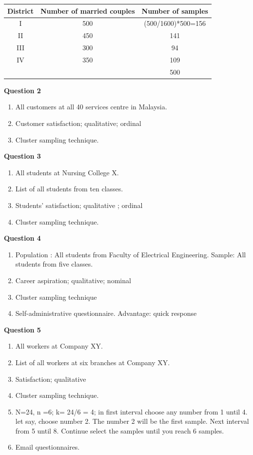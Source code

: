 \documentclass[
  a4paper,
  DIV=11,
  numbers=noendperiod,
  oneside]{scrreprt}
\providecommand{\tightlist}{%
  \setlength{\itemsep}{0pt}\setlength{\parskip}{0pt}}\usepackage{longtable,booktabs,array}
\begin{document}
\begin{longtable}[]{@{}ccc@{}}
\toprule\noalign{}
District & Number of married couples & Number of samples \\
\midrule\noalign{}
\endhead
\bottomrule\noalign{}
\endlastfoot
I & 500 & (500/1600)*500=156 \\
II & 450 & 141 \\
III & 300 & 94 \\
IV & 350 & 109 \\
& & 500 \\
\end{longtable}

\textbf{Question 2}

\begin{enumerate}
\def\labelenumi{\alph{enumi})}
\tightlist
\item
  All customers at all 40 services centre in Malaysia.
\item
  Customer satisfaction; qualitative; ordinal
\item
  Cluster sampling technique.
\end{enumerate}

\textbf{Question 3}

\begin{enumerate}
\def\labelenumi{\alph{enumi})}
\tightlist
\item
  All students at Nursing College X.
\item
  List of all students from ten classes.
\item
  Students' satisfaction; qualitative ; ordinal
\item
  Cluster sampling technique.
\end{enumerate}

\textbf{Question 4}

\begin{enumerate}
\def\labelenumi{\alph{enumi})}
\tightlist
\item
  Population : All students from Faculty of Electrical Engineering.
  Sample: All students from five classes.
\item
  Career aspiration; qualitative; nominal
\item
  Cluster sampling technique
\item
  Self-administrative questionnaire. Advantage: quick response
\end{enumerate}

\textbf{Question 5}

\begin{enumerate}
\def\labelenumi{\alph{enumi})}
\tightlist
\item
  All workers at Company XY.
\item
  List of all workers at six branches at Company XY.
\item
  Satisfaction; qualitative
\item
  Cluster sampling technique.
\item
  N=24, n =6; k= 24/6 = 4; in first interval choose any number from 1
  until 4. let say, choose number 2. The number 2 will be the first
  sample. Next interval from 5 until 8. Continue select the samples
  until you reach 6 samples.
\item
  Email questionnaires.
\end{enumerate}
\end{document}
